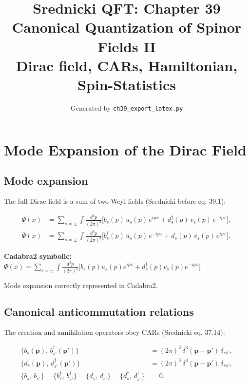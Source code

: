 \documentclass[12pt]{article}
\title{\textbf{Srednicki QFT: Chapter 39}\\[6pt]
       \large Canonical Quantization of Spinor Fields II\\[4pt]
       \normalsize Dirac field, CARs, Hamiltonian, Spin-Statistics}
\author{Generated by \texttt{ch39\_export\_latex.py}}
\date{}
\newcommand{\cdbexpr}[1]{\textcolor{cadblue}{$#1$}}
\newcommand{\verified}[1]{\textcolor{verifygreen}{\checkmark\; #1}}
\begin{document}
\maketitle
\tableofcontents
\newpage

\section{Mode Expansion of the Dirac Field}

\subsection{Mode expansion}

The full Dirac field is a sum of two Weyl fields
(Srednicki before eq. 39.1):
\begin{mdframed}[backgroundcolor=blue!5]
\begin{align}
\Psi(x) &= \sum_{s=\pm}\int\frac{d^3p}{(2\pi)^3}
  \bigl[ b_s(p)\,u_s(p)\,e^{ipx}
        + d_s^\dagger(p)\,v_s(p)\,e^{-ipx} \bigr] , \tag{39.1a}\\[6pt]
\bar\Psi(x) &= \sum_{s=\pm}\int\frac{d^3p}{(2\pi)^3}
  \bigl[ b_s^\dagger(p)\,\bar u_s(p)\,e^{-ipx}
        + d_s(p)\,\bar v_s(p)\,e^{ipx} \bigr] . \tag{39.1b}
\end{align}
\end{mdframed}

\textbf{Cadabra2 symbolic:}
\cdbexpr{\Psi(x) = \sum_{s=\pm}\int\frac{d^3p}{(2\pi)^3}
  \bigl[ b_s(p) u_s(p) e^{ipx}
        + d_s^{\dagger}(p) v_s(p) e^{-ipx} \bigr] }

\verified{Mode expansion correctly represented in Cadabra2.}

\subsection{Canonical anticommutation relations}

The creation and annihilation operators obey CARs (Srednicki eq. 37.14):
\begin{mdframed}[backgroundcolor=green!5]
\begin{align}
\{b_s(\mathbf{p}),\,b_{s'}^\dagger(\mathbf{p}')\} &= (2\pi)^3\,\delta^3(\mathbf{p}-\mathbf{p}')\,\delta_{ss'},\\[4pt]
\{d_s(\mathbf{p}),\,d_{s'}^\dagger(\mathbf{p}')\} &= (2\pi)^3\,\delta^3(\mathbf{p}-\mathbf{p}')\,\delta_{ss'},\\[4pt]
\{b_s,\,b_{s'}\}=\{b_s^\dagger,\,b_{s'}^\dagger\}
 =\{d_s,\,d_{s'}\}=\{d_s^\dagger,\,d_{s'}^\dagger\} &= 0 .
\end{align}
\end{mdframed}
\end{document}
